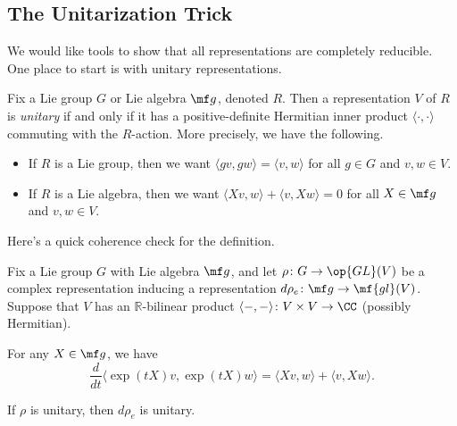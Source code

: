 \documentclass[../notes.tex]{subfiles}
\begin{document}
\subsection{The Unitarization Trick}
We would like tools to show that all representations are completely reducible. One place to start is with unitary representations.
\begin{definition}
	Fix a Lie group $G$ or Lie algebra $\mf g$, denoted $R$. Then a representation $V$ of $R$ is \textit{unitary} if and only if it has a positive-definite Hermitian inner product $\langle\cdot,\cdot\rangle$ commuting with the $R$-action. More precisely, we have the following.
	\begin{itemize}
		\item If $R$ is a Lie group, then we want $\langle gv,gw\rangle=\langle v,w\rangle$ for all $g\in G$ and $v,w\in V$.
		\item If $R$ is a Lie algebra, then we want $\langle Xv,w\rangle+\langle v,Xw\rangle=0$ for all $X\in\mf g$ and $v,w\in V$.
	\end{itemize}
\end{definition}
Here's a quick coherence check for the definition.
\begin{lemma}
	Fix a Lie group $G$ with Lie algebra $\mf g$, and let $\rho\colon G\to\op{GL}(V)$ be a complex representation inducing a representation $d\rho_e\colon\mf g\to\mf{gl}(V)$. Suppose that $V$ has an $\mathbb R$-bilinear product $\langle-,-\rangle\colon V\times V\to\CC$ (possibly Hermitian).
	\begin{listalph}
		\item For any $X\in\mf g$, we have
		\[\frac d{dt}\langle\exp(tX)v,\exp(tX)w\rangle=\langle Xv,w\rangle+\langle v,Xw\rangle.\]
		\item If $\rho$ is unitary, then $d\rho_e$ is unitary.
	\end{listalph}
\end{lemma}
\end{document}
